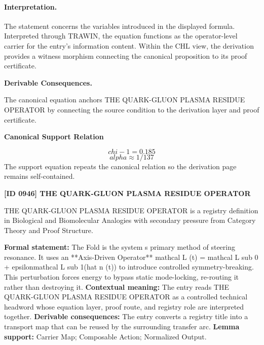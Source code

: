 \paragraph{Interpretation.}
The statement concerns the variables introduced in the displayed formula. Interpreted through TRAWIN, the equation functions as the operator-level carrier for the entry’s information content. Within the CHL view, the derivation provides a witness morphism connecting the canonical proposition to its proof certificate.

\par\vspace{0.35em}
\noindent\textbf{Derivable Consequences.}\quad
\begingroup
\footnotesize
\raggedright
The canonical equation anchors THE QUARK-GLUON PLASMA RESIDUE OPERATOR by connecting the source condition to the derivation layer and proof certificate.
\par\endgroup

\noindent\textbf{Canonical Support Relation}\par
\[
chi - 1 = 0.185
\]
\[
alpha \approx 1/137
\]
\noindent The support equation repeats the canonical relation so the derivation page remains self-contained.\par

\clearpage
\noindent\textbf{[ID 0946] THE QUARK-GLUON PLASMA RESIDUE OPERATOR}\par
\vspace{0.35em}
\begingroup\small
{}
THE QUARK-GLUON PLASMA RESIDUE OPERATOR is a registry definition in Biological and Biomolecular Analogies with secondary pressure from Category Theory and Proof Structure.

\begingroup\footnotesize\setlength{\emergencystretch}{3em}\sloppy
\textbf{Formal statement:} The Fold is the system s primary method of steering resonance. It uses an **Axis-Driven Operator** mathcal L (t) = mathcal L sub 0 + epsilonmathcal L sub 1(hat n (t)) to introduce controlled symmetry-breaking. This perturbation forces energy to bypass static mode-locking, re-routing it rather than destroying it. \textbf{Contextual meaning:} The entry reads THE QUARK-GLUON PLASMA RESIDUE OPERATOR as a controlled technical headword whose equation layer, proof route, and registry role are interpreted together. \textbf{Derivable consequences:} The entry converts a registry title into a transport map that can be reused by the surrounding transfer arc. \textbf{Lemma support:} Carrier Map; Composable Action; Normalized Output.\par
\endgroup

